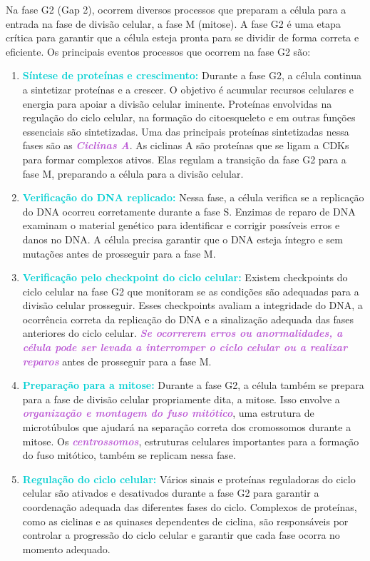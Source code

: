 \documentclass[11pt,a4paper]{article}
\begin{document}
	Na fase G2 (Gap 2), ocorrem diversos processos que preparam a célula para a entrada na fase de divisão celular, a fase M (mitose). A fase G2 é uma etapa crítica para garantir que a célula esteja pronta para se dividir de forma correta e eficiente. Os principais eventos processos que ocorrem na fase G2 são:

	\begin{enumerate}
		\item \textcolor{DarkTurquoise}{\textbf{Síntese de proteínas e crescimento:}} Durante a fase G2, a célula continua a sintetizar proteínas e a crescer. O objetivo é acumular recursos celulares e energia para apoiar a divisão celular iminente. Proteínas envolvidas na regulação do ciclo celular, na formação do citoesqueleto e em outras funções essenciais são sintetizadas. Uma das principais proteínas sintetizadas nessa fases são as \textcolor{MediumOrchid}{\textbf{\textit{Ciclinas A}}}. As ciclinas A são proteínas que se ligam a CDKs para formar complexos ativos. Elas regulam a transição da fase G2 para a fase M, preparando a célula para a divisão celular.
		\item \textcolor{DarkTurquoise}{\textbf{Verificação do DNA replicado:}} Nessa fase, a célula verifica se a replicação do DNA ocorreu corretamente durante a fase S. Enzimas de reparo de DNA examinam o material genético para identificar e corrigir possíveis erros e danos no DNA. A célula precisa garantir que o DNA esteja íntegro e sem mutações antes de prosseguir para a fase M.
		\item \textcolor{DarkTurquoise}{\textbf{Verificação pelo checkpoint do ciclo celular:}} Existem checkpoints do ciclo celular na fase G2 que monitoram se as condições são adequadas para a divisão celular prosseguir. Esses checkpoints avaliam a integridade do DNA, a ocorrência correta da replicação do DNA e a sinalização adequada das fases anteriores do ciclo celular. \textcolor{MediumOrchid}{\textbf{\textit{Se ocorrerem erros ou anormalidades, a célula pode ser levada a interromper o ciclo celular ou a realizar reparos}}} antes de prosseguir para a fase M.
		\item \textcolor{DarkTurquoise}{\textbf{Preparação para a mitose:}} Durante a fase G2, a célula também se prepara para a fase de divisão celular propriamente dita, a mitose. Isso envolve a \textcolor{MediumOrchid}{\textbf{\textit{organização e montagem do fuso mitótico}}}, uma estrutura de microtúbulos que ajudará na separação correta dos cromossomos durante a mitose. Os \textcolor{MediumOrchid}{\textbf{\textit{centrossomos}}}, estruturas celulares importantes para a formação do fuso mitótico, também se replicam nessa fase.
		\item \textcolor{DarkTurquoise}{\textbf{Regulação do ciclo celular:}} Vários sinais e proteínas reguladoras do ciclo celular são ativados e desativados durante a fase G2 para garantir a coordenação adequada das diferentes fases do ciclo. Complexos de proteínas, como as ciclinas e as quinases dependentes de ciclina, são responsáveis por controlar a progressão do ciclo celular e garantir que cada fase ocorra no momento adequado.
	\end{enumerate}
\end{document}
